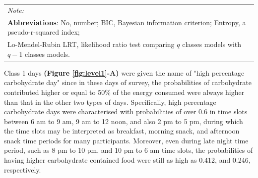 \begin{table}[H]
\begin{tabular}[t]{lccccc}
		\bottomrule
		\multicolumn{6}{l}{{\scriptsize \textit{Note: }}}\\
		\multicolumn{6}{l}{{\scriptsize \textbf{Abbreviations}: No, number; BIC, Bayesian information criterion; Entropy, a pseudo-r-squared index;}}\\ 
		\multicolumn{6}{l}{{\scriptsize Lo-Mendel-Rubin LRT, likelihood ratio test comparing $q$ classes models with $q-1$ classes models.}}\\
	\end{tabular}
\end{table}

\vspace{-0.5cm}


Class 1 days \textbf{(Figure \ref{fig:level1}-A)} were given the name of "high percentage carbohydrate day" since in these days of survey, the probabilities of carbohydrate contributed higher or equal to 50\% of the energy consumed were always higher than that in the other two types of days. Specifically, high percentage carbohydrate days were characterised with probabilities of over 0.6 in time slots between 6 am to 9 am, 9 am to 12 noon, and also 2 pm to 5 pm, during which the time slots may be interpreted as breakfast, morning snack, and afternoon snack time periods for many participants. Moreover, even during late night time period, such as 8 pm to 10 pm, and 10 pm to 6 am time slots, the probabilities of having higher carbohydrate contained food were still as high as 0.412, and 0.246, respectively.




